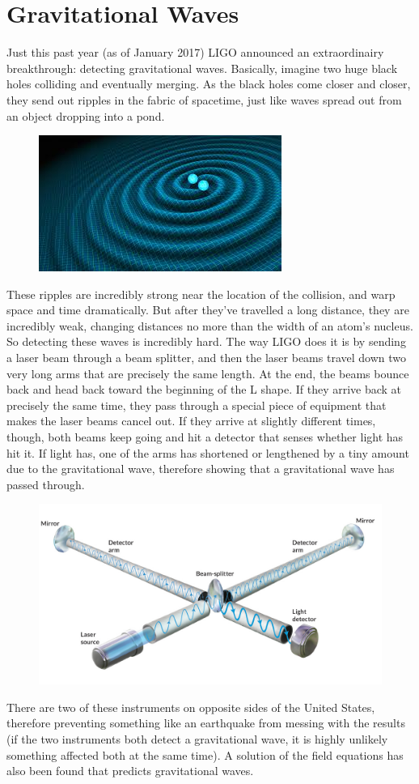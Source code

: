\section{Gravitational Waves}
Just this past year (as of January 2017) LIGO announced an extraordinairy breakthrough: detecting gravitational waves. Basically, imagine
two huge black holes colliding and eventually merging. As the black holes come closer and closer, they send out ripples in the fabric
of spacetime, just like waves spread out from an object dropping into a pond. 
\begin{figure}[H]
\includegraphics[scale=0.5]{gwaves.jpg}
\end{figure}
These ripples are incredibly strong near the location of the
collision, and warp space and time dramatically. But after they've travelled a long distance, they are incredibly weak, changing distances
no more than the width of an atom's nucleus. So detecting these waves is incredibly hard. The way LIGO does it is by sending a laser beam
through a beam splitter, and then the laser beams travel down two very long arms that are precisely the same length. At the end, the beams bounce back and head back toward the beginning of the 
L shape. If they arrive back at precisely the same time, they pass through a special piece of equipment that makes the laser beams cancel out.
If they arrive at slightly different times, though, both beams keep going and hit a detector that senses whether light has hit it.
If light has, one of the arms has shortened or lengthened by a tiny amount due to the gravitational wave, therefore showing that a gravitational
wave has passed through.
\begin{figure}[H]
\includegraphics[scale=0.5]{ligo.jpg}
\end{figure}
There are two of these instruments on opposite sides of the United States, therefore preventing something like an earthquake from messing with
the results (if the two instruments both detect a gravitational wave, it is highly unlikely something affected both at the same time).
A solution of the field equations has also been found that predicts gravitational waves.
